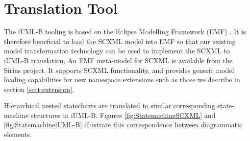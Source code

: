
\section{Translation Tool}
\label{sec:translation}

The iUML-B tooling is based on the Eclipse Modelling Framework (EMF) \cite{steinberg2009emf}. 
It is therefore beneficial to load the SCXML model into EMF so that our existing model transformation technology can be used to 
implement the SCXML to iUML-B translation. 
An EMF meta-model for SCXML is available from the Sirius \cite{siriuswebsite} project. 
It supports SCXML functionality, and provides generic model
loading capabilities for new namespace extensions such as those we 
describe in section \ref{sect:extension}.

Hierarchical nested statecharts are translated to similar corresponding  state-machine structures in iUML-B.  
Figures \ref{fig:StatemachineSCXML} and \ref{fig:StatemachineiUML-B} illustrate this correspondence between diagrammatic elements. 






